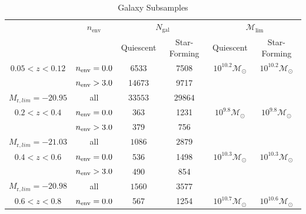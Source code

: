 \begin{table} 
  \caption{Galaxy Subsamples}
  \label{tab:subsample}
  \begin{center}
    \leavevmode
    \begin{tabular}{cccccc} \hline \hline              
     &\multicolumn{1}{c}{$n_{\mathrm{env}}$}        & \multicolumn{2}{c}{$N_{\mathrm{gal}}$}  & \multicolumn{2}{c}{$\mathcal{M}_{\mathrm{lim}}$}  \\ 
     & & Quiescent & Star-Forming & Quiescent & Star-Forming  \\ \hline 
        $0.05 < z < 0.12$ & $n_{\mathrm{env}} = 0.0 $ & 6533 & 7508 & $10^{10.2} \mathcal{M}_{\odot}$ & $10^{10.2} \mathcal{M}_{\odot}$  \\
                          & $n_{\mathrm{env}} > 3.0 $ &14673 & 9717 \\ 
        $M_{\mathrm{r}, lim} = -20.95$ & all          &$33553$                       & $29864$                          \\ \hline
        $0.2 < z < 0.4$      &$n_{\mathrm{env}} = 0.0 $           &363                    &1231 & $10^{9.8} \mathcal{M}_{\odot}$ & $10^{9.8} \mathcal{M}_{\odot}$ \\
                             &$n_{\mathrm{env}} > 3.0 $            &379                    &756                           \\
        $M_{\mathrm{r}, lim} = -21.03$               & all                & $1086$                      & $2879$                          \\ \hline
        $0.4 < z < 0.6$      &$n_{\mathrm{env}} = 0.0 $           &536                       &1498 & $10^{10.3} \mathcal{M}_{\odot}$ & $10^{10.3} \mathcal{M}_{\odot}$ \\
                             &$n_{\mathrm{env}} > 3.0 $            &490                       &854                           \\
        $M_{\mathrm{r}, lim} = -20.98$              & all               & $1560$                      & $3577$                          \\ \hline
        $0.6 < z < 0.8$      &$n_{\mathrm{env}} = 0.0 $           &567                       &1254  & $10^{10.7} \mathcal{M}_{\odot}$ & $10^{10.6} \mathcal{M}_{\odot}$ \\

\end{tabular}
\end{center}
\end{table}

